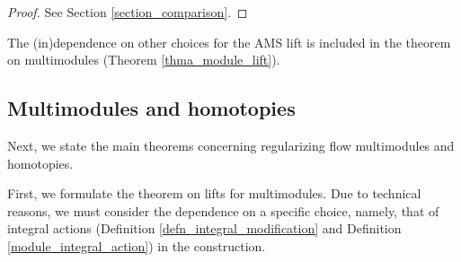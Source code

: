 \documentclass[reqno, 10pt]{amsart}
\numberwithin{equation}{section}
\numberwithin{equation}{section}
\theoremstyle{definition}
\theoremstyle{remark}
\begin{document}
\begin{proof}
See Section \ref{section_comparison}.
\end{proof}

The (in)dependence on other choices for the AMS lift is included in the theorem on multimodules (Theorem \ref{thma_module_lift}). 


\subsection{Multimodules and homotopies}

Next, we state the main theorems concerning regularizing flow multimodules and homotopies.










First, we formulate the theorem on lifts for multimodules. Due to technical reasons, we must consider the dependence on a specific choice, namely, that of integral actions (Definition \ref{defn_integral_modification} and Definition \ref{module_integral_action}) in the construction.
\end{document}
